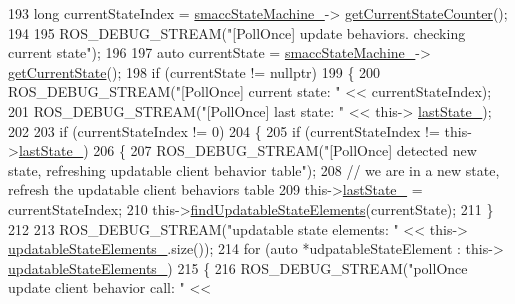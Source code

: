 \begin{DoxyCode}
193                 \textcolor{keywordtype}{long} currentStateIndex = \hyperlink{classsmacc_1_1SignalDetector_a46025de6ac7b5980e22144f9703236a4}{smaccStateMachine\_}->
      \hyperlink{classsmacc_1_1ISmaccStateMachine_aad27c0182b53245d0aded22e63cd83bd}{getCurrentStateCounter}();
194 
195                 ROS\_DEBUG\_STREAM(\textcolor{stringliteral}{"[PollOnce] update behaviors. checking current state"});
196 
197                 \textcolor{keyword}{auto} currentState = \hyperlink{classsmacc_1_1SignalDetector_a46025de6ac7b5980e22144f9703236a4}{smaccStateMachine\_}->
      \hyperlink{classsmacc_1_1ISmaccStateMachine_a610d09dc5341fb63732be713c21fbe86}{getCurrentState}();
198                 \textcolor{keywordflow}{if} (currentState != \textcolor{keyword}{nullptr})
199                 \{
200                     ROS\_DEBUG\_STREAM(\textcolor{stringliteral}{"[PollOnce] current state: "} << currentStateIndex);
201                     ROS\_DEBUG\_STREAM(\textcolor{stringliteral}{"[PollOnce] last state: "} << this->
      \hyperlink{classsmacc_1_1SignalDetector_a72293ed0e98f4200fbe75b53f1e41eab}{lastState\_});
202 
203                     \textcolor{keywordflow}{if} (currentStateIndex != 0)
204                     \{
205                         \textcolor{keywordflow}{if} (currentStateIndex != this->\hyperlink{classsmacc_1_1SignalDetector_a72293ed0e98f4200fbe75b53f1e41eab}{lastState\_})
206                         \{
207                             ROS\_DEBUG\_STREAM(\textcolor{stringliteral}{"[PollOnce] detected new state, refreshing updatable client
       behavior table"});
208                             \textcolor{comment}{// we are in a new state, refresh the updatable client behaviors table}
209                             this->\hyperlink{classsmacc_1_1SignalDetector_a72293ed0e98f4200fbe75b53f1e41eab}{lastState\_} = currentStateIndex;
210                             this->\hyperlink{classsmacc_1_1SignalDetector_a443234ebdf8cedd45cde725e64639dfe}{findUpdatableStateElements}(currentState);
211                         \}
212 
213                         ROS\_DEBUG\_STREAM(\textcolor{stringliteral}{"updatable state elements: "} << this->
      \hyperlink{classsmacc_1_1SignalDetector_a07a5e7bb00c348435d954e22682fa610}{updatableStateElements\_}.size());
214                         \textcolor{keywordflow}{for} (\textcolor{keyword}{auto} *udpatableStateElement : this->
      \hyperlink{classsmacc_1_1SignalDetector_a07a5e7bb00c348435d954e22682fa610}{updatableStateElements\_})
215                         \{
216                             ROS\_DEBUG\_STREAM(\textcolor{stringliteral}{"pollOnce update client behavior call: "} << 

\end{DoxyCode}
